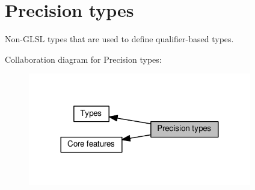 \hypertarget{group__core__precision}{}\section{Precision types}
\label{group__core__precision}


Non-\/\+G\+L\+SL types that are used to define qualifier-\/based types.  


Collaboration diagram for Precision types\+:
\nopagebreak
\begin{figure}[H]
\begin{center}
\leavevmode
\includegraphics[width=276pt]{d3/dab/group__core__precision}
\end{center}
\end{figure}
